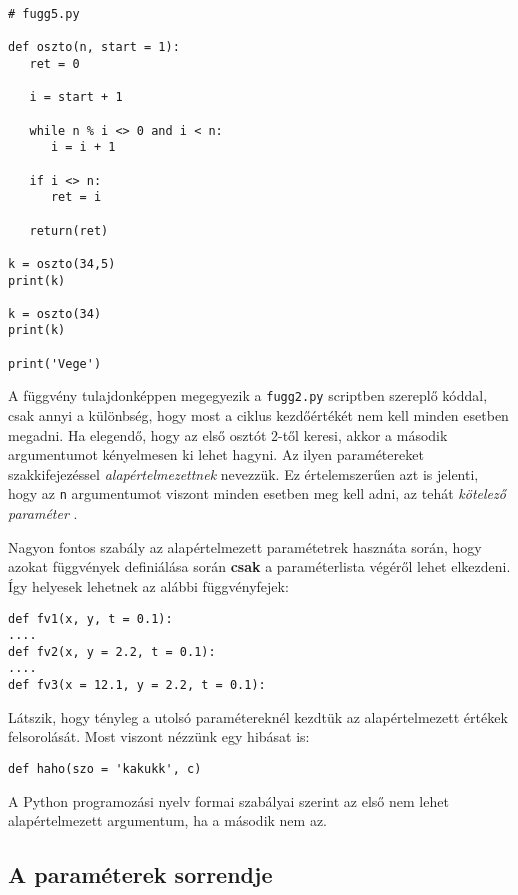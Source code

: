 \documentclass[12pt]{article}
\begin{document}
\begin{Verbatim}[fontsize=\small]
# fugg5.py

def oszto(n, start = 1):
   ret = 0

   i = start + 1

   while n % i <> 0 and i < n:
      i = i + 1

   if i <> n:
      ret = i

   return(ret)

k = oszto(34,5)
print(k)

k = oszto(34)
print(k)

print('Vege')  
\end{Verbatim}

A f\"uggv\'eny tulajdonk\'eppen megegyezik a {\tt fugg2.py} scriptben szerepl\H{o} k\'oddal, csak annyi a 
k\"ul\"onbs\'eg, hogy most a ciklus kezd\H{o}\'ert\'ek\'et nem kell minden esetben megadni. Ha elegend\H{o}, 
hogy az els\H{o} oszt\'ot $2$-t\H{o}l keresi, akkor a m\'asodik argumentumot k\'enyelmesen ki lehet hagyni. Az 
ilyen param\'etereket szakkifejez\'essel {\sl alap\'ertelmezettnek}  nevezz\"uk. 
Ez \'ertelemszer\H{u}en azt is jelenti, hogy az {\tt n} argumentumot viszont minden esetben meg kell adni, az teh\'at 
{\sl k\"otelez\H{o} param\'eter} . 

Nagyon fontos szab\'aly az alap\'ertelmezett param\'etetrek haszn\'ata sor\'an, hogy azokat f\"uggv\'enyek 
defini\'al\'asa sor\'an {\bf csak} a param\'eterlista v\'eg\'er\H{o}l lehet elkezdeni. \'Igy helyesek lehetnek az 
al\'abbi f\"uggv\'enyfejek:

\begin{Verbatim}[fontsize=\small]
def fv1(x, y, t = 0.1):
....
def fv2(x, y = 2.2, t = 0.1):
....
def fv3(x = 12.1, y = 2.2, t = 0.1):
\end{Verbatim}

L\'atszik, hogy t\'enyleg a utols\'o param\'eterekn\'el kezdt\"uk az alap\'ertelmezett \'ert\'ekek felsorol\'as\'at. Most 
viszont n\'ezz\"unk egy hib\'asat is:

\begin{Verbatim}[fontsize=\small]
def haho(szo = 'kakukk', c)
\end{Verbatim}

A Python programoz\'asi nyelv formai szab\'alyai szerint az els\H{o} nem lehet alap\'ertelmezett argumentum, ha a 
m\'asodik nem az.

\subsection{A param\'eterek sorrendje}
\end{document}
